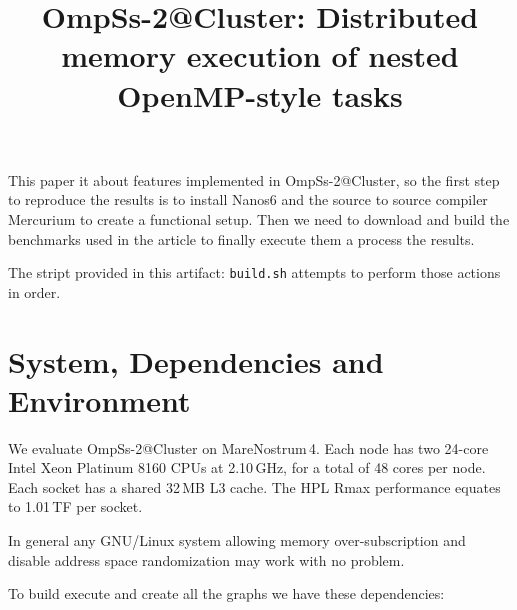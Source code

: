 \documentclass{article}
\newcommand{\code}[1]{\texttt{#1}}
\begin{document}
\title{OmpSs-2@Cluster: Distributed memory execution of nested OpenMP-style tasks}


\maketitle

This paper it about features implemented in OmpSs-2@Cluster, so the
first step to reproduce the results is to install Nanos6 and the
source to source compiler Mercurium to create a functional setup. Then
we need to download and build the benchmarks used in the article to
finally execute them a process the results.

The stript provided in this artifact: \code{build.sh} attempts to
perform those actions in order.

\section{System, Dependencies and Environment}

We evaluate OmpSs-2@Cluster on MareNostrum\,4. Each node has two
24-core Intel Xeon Platinum 8160 CPUs at 2.10\,GHz, for a total of 48
cores per node.  Each socket has a shared 32\,MB L3 cache.  The HPL
Rmax performance equates to 1.01\,TF per socket.

In general any GNU/Linux system allowing memory over-subscription and
disable address space randomization may work with no problem.

To build execute and create all the graphs we have these dependencies:
\end{document}
